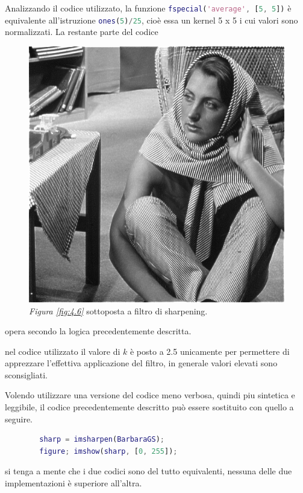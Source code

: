 \documentclass{subfiles}
\begin{document}
Analizzando il codice utilizzato, la funzione \lstinline[language = MATLAB]{fspecial('average', [5, 5])} è equivalente all'istruzione
\lstinline[language = MATLAB]{ones(5)/25}, cioè essa un kernel 5 x 5 i cui valori sono normalizzati.
La restante parte del codice
\begin{figure}
    \centering
    \includegraphics[scale = 0.325]{../Images/Barbara/SharpBarbara.png}
    \caption{\emph{Figura \ref{fig:4.6}} sottoposta a filtro di sharpening.}
    \label{fig:4.7}
\end{figure}
opera secondo la logica precedentemente descritta.

\begin{Note*}
    nel codice utilizzato il valore di \(k\) è posto a 2.5 unicamente per permettere di apprezzare l'effettiva applicazione del filtro,
    in generale valori elevati sono sconsigliati.
\end{Note*}

Volendo utilizzare una versione del codice meno verbosa, quindi piu sintetica e leggibile, il codice precedentemente descritto può essere sostituito con quello a seguire.
\begin{center}
    \begin{lstlisting}[language = MATLAB]
        % caricamento di BarbaraGS.png
        sharp = imsharpen(BarbaraGS);
        figure; imshow(sharp, [0, 255]);
    \end{lstlisting}
\end{center}

\begin{Remark*}
    si tenga a mente che i due codici sono del tutto equivalenti, nessuna delle due implementazioni è superiore all'altra.
\end{Remark*}
\end{document}
